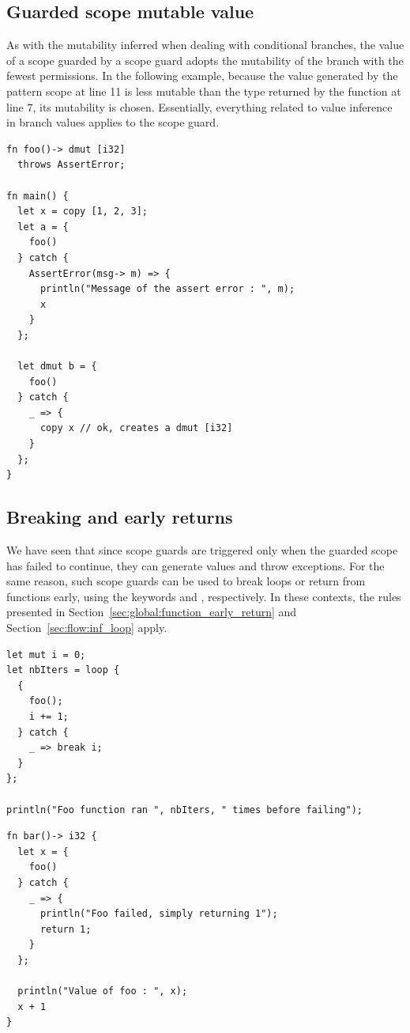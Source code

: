 \subsection{Guarded scope mutable value}

As with the mutability inferred when dealing with conditional branches, the
value of a scope guarded by a  scope guard adopts the mutability of
the branch with the fewest permissions. In the following example, because the
value generated by the  pattern scope at line 11 is less mutable
than the type returned by the function  at line 7, its mutability is
chosen. Essentially, everything related to value inference in branch values
applies to the  scope guard.

\begin{lstlisting}[style=coloredverbatim]
fn foo()-> dmut [i32]
  throws AssertError;

fn main() {
  let x = copy [1, 2, 3];
  let a = {
    foo()
  } catch {
    AssertError(msg-> m) => {
      println("Message of the assert error : ", m);
      x
    }
  };

  let dmut b = {
    foo()
  } catch {
    _ => {
      copy x // ok, creates a dmut [i32]
    }
  };
}
\end{lstlisting}

\subsection{Breaking and early returns}

We have seen that since  scope guards are triggered only when the
guarded scope has failed to continue, they can generate values and throw
exceptions. For the same reason, such scope guards can be used to break loops or
return from functions early, using the keywords  and
, respectively. In these contexts, the rules presented in
Section~\ref{sec:global:function_early_return} and Section~\ref{sec:flow:inf_loop} apply.

\begin{lstlisting}[style=coloredverbatim]
let mut i = 0;
let nbIters = loop {
  {
    foo();
    i += 1;
  } catch {
    _ => break i;
  }
};

println("Foo function ran ", nbIters, " times before failing");
\end{lstlisting}

\begin{lstlisting}[style=coloredverbatim]
fn bar()-> i32 {
  let x = {
    foo()
  } catch {
    _ => {
      println("Foo failed, simply returning 1");
      return 1;
    }
  };

  println("Value of foo : ", x);
  x + 1
}
\end{lstlisting}

